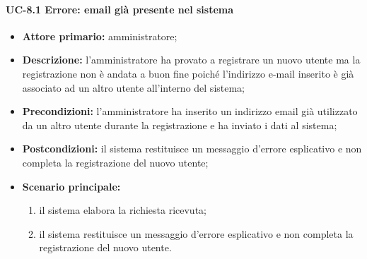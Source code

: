     \paragraph{UC-8.1 Errore: email già presente nel sistema}
    \begin{itemize}
        \item \textbf{Attore primario:} amministratore;
    
        \item \textbf{Descrizione:} l'amministratore ha provato a registrare un nuovo utente ma la registrazione non è andata a buon fine poiché l'indirizzo e-mail inserito è già associato ad un altro utente all'interno del sistema;
    
        \item \textbf{Precondizioni:} l'amministratore ha inserito un indirizzo email già utilizzato da un altro utente durante la registrazione e ha inviato i dati al sistema;
    
        \item \textbf{Postcondizioni:} il sistema restituisce un messaggio d'errore esplicativo e non completa la registrazione del nuovo utente;
    
        \item \textbf{Scenario principale:}
              \begin{enumerate}
                  \item il sistema elabora la richiesta ricevuta;
                  \item il sistema restituisce un messaggio d'errore esplicativo e non completa la registrazione del nuovo utente.
              \end{enumerate}
    \end{itemize}

